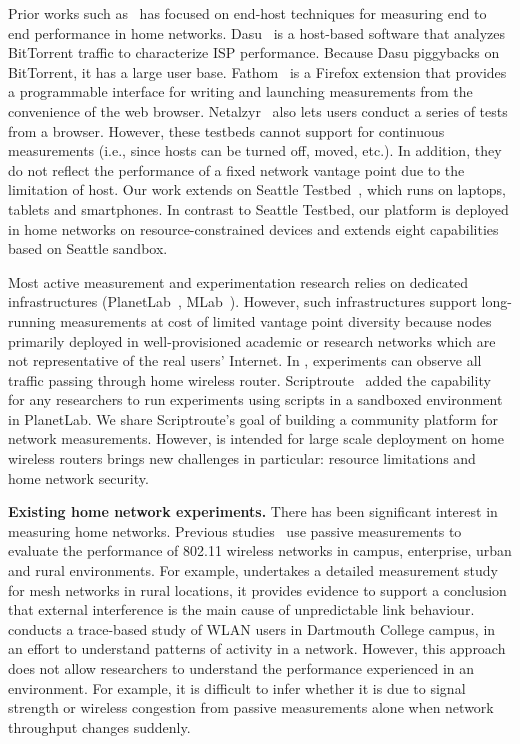 Prior works such as~\cite{sanchez2014measurement,dhawan2012fathom,kreibich2010netalyzr} has focused on end-host techniques for measuring end to end performance in home networks. Dasu~\cite{sanchez2014measurement} is a host-based software that analyzes BitTorrent traffic to characterize ISP performance. Because Dasu piggybacks on BitTorrent, it has a large user base. Fathom~\cite{dhawan2012fathom} is a Firefox extension that provides a programmable interface for writing and launching measurements from the convenience of the web browser. Netalzyr~\cite{kreibich2010netalyzr} also lets users conduct a series of tests from a browser. However, these testbeds cannot support for continuous measurements (i.e., since hosts can be turned off, moved, etc.). In addition, they do not reflect the performance of a fixed network vantage point due to the limitation of host. Our work extends on Seattle Testbed~\cite{cappos2009seattle}, which runs on laptops, tablets and smartphones. In contrast to Seattle Testbed, our platform is deployed in home networks on resource-constrained devices and extends eight capabilities based on Seattle sandbox.

Most active measurement and experimentation research relies on dedicated infrastructures (PlanetLab~\cite{chun2003planetlab}, MLab~\cite{mlab}). However, such infrastructures support long-running measurements at cost of limited vantage point diversity because nodes primarily deployed in well-provisioned academic or research networks which are not representative of the real users' Internet. In \sysname, experiments can observe all traffic passing through home wireless router. Scriptroute~\cite{spring2003scriptroute} added the capability for any researchers to run experiments using scripts in a sandboxed environment in PlanetLab. We share Scriptroute's goal of building a community platform for network measurements. However, \sysname is intended for large scale deployment on home wireless routers brings new challenges in particular: resource limitations and home network security.

\textbf{Existing home network experiments.} There has been significant interest in measuring home networks. Previous studies~\cite{aguayo2004link,kotz2005analysis,raman2009feasibility} use passive measurements to evaluate the performance of 802.11 wireless networks in campus, enterprise, urban and rural environments. For example, \cite{raman2009feasibility} undertakes a detailed measurement study for mesh networks in rural locations, it provides evidence to support a conclusion that external interference is the main cause of unpredictable link behaviour. \cite{kotz2005analysis} conducts a trace-based study of WLAN users in Dartmouth College campus, in an effort to understand patterns of activity in a network. However, this approach does not allow researchers to understand the performance experienced in an environment. For example, it is difficult to infer whether it is due to signal strength or wireless congestion from passive measurements alone when network throughput changes suddenly.

